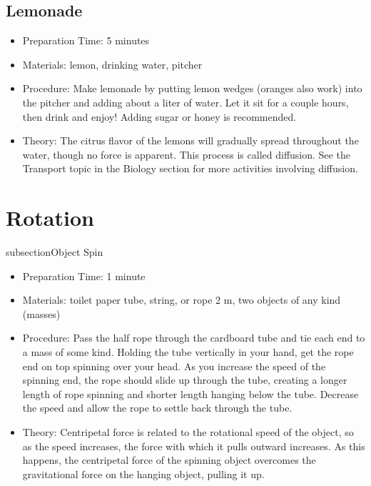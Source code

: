 \subsection{Lemonade}
\begin{itemize}
\item{Preparation Time: 5 minutes}
\item{Materials: lemon, drinking water, pitcher}
\item{Procedure: Make lemonade by putting lemon wedges (oranges also work) into the pitcher and adding about a liter of water. Let it sit for a couple hours, then drink and enjoy! Adding sugar or honey is recommended.}
\item{Theory: The citrus flavor of the lemons will gradually spread throughout the water, though no force is apparent. This process is called diffusion. See the Transport topic in the Biology section for more activities involving diffusion.}
\end{itemize}

\section{Rotation}
subsection{Object Spin}
\begin{itemize}
\item{Preparation Time: 1 minute}
\item{Materials: toilet paper tube, string, or rope 2 m, two objects of any kind (masses)}
\item{Procedure: Pass the half rope through the cardboard tube and tie each end to a mass of some kind. Holding the tube vertically in your hand, get the rope end on top spinning over your head. As you increase the speed of the spinning end, the rope should slide up through the tube, creating a longer length of rope spinning and shorter length hanging below the tube. Decrease the speed and allow the rope to settle back through the tube.}
\item{Theory: Centripetal force is related to the rotational speed of the object, so as the speed increases, the force with which it pulls outward increases. As this happens, the centripetal force of the spinning object overcomes the gravitational force on the hanging object, pulling it up.}
\end{itemize}

